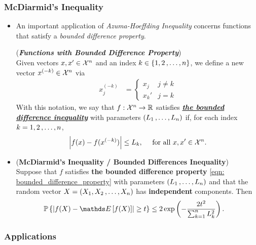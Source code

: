 \documentclass[11pt]{article}
\begin{document}
\subsubsection{McDiarmid's Inequality}
\begin{itemize}
\item An important application of \emph{Azuma-Hoeffding Inequality} concerns functions that satisfy a \emph{bounded difference property}. 
\begin{definition} (\textbf{\emph{Functions with Bounded Difference Property}})\\
Given vectors $x, x' \in {\mathcal X}^n$ and an index $k \in \left\{1, 2 \,{,}\ldots{,}\, n\right\}$, we define a new vector $x^{(-k)} \in {\mathcal X}^n$ via
\begin{align*}
x_j^{(-k)} &= \left\{\begin{array}{cc}
x_j & j \neq k\\
x_k'& j = k
\end{array}
\right.
\end{align*}
With this notation, we say that $f: {\mathcal X}^n \to {\mathbb R}$ satisfies \underline{\textbf{\emph{the bounded difference inequality}}} with parameters $(L_1 \,{,}\ldots{,}\, L_n)$ if, for each index $k = 1, 2 \,{,}\ldots{,}\, n$,
\begin{align}
\left\lvert f(x) - f(x^{(-k)}) \right\rvert \le L_k, \quad\text{ for all }x, x' \in {\mathcal X}^n. \label{eqn: bounded_difference_property}
\end{align}
\end{definition}


\item \begin{corollary} (\textbf{McDiarmid's Inequality / Bounded Differences Inequality})\citep{wainwright2019high}\\
Suppose that $f$ satisfies \textbf{the bounded difference property} \eqref{eqn: bounded_difference_property} with parameters $(L_1 \,{,}\ldots{,}\, L_n)$ and that the random vector $X = (X_1, X_2 \,{,}\ldots{,}\, X_n)$ has \textbf{independent} components. Then
\begin{align}
\bP\set{\abs{f(X) - \E{}{f(X)}} \ge t } &\le  2 \exp\paren{- \frac{2 t^2}{ \sum_{k=1}^{n}L_k^2}}. \label{ineqn: macdiarmid_bounded_difference_inequality}
\end{align}
\end{corollary}
\end{itemize}

\subsubsection{Applications}
\end{document}

